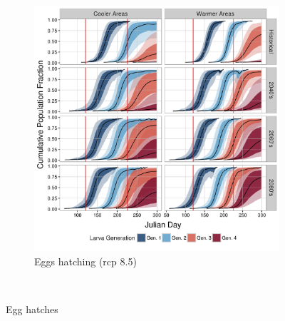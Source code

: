 \documentclass[12pt]{article}
\theoremstyle{plain}
\theoremstyle{definition}
\theoremstyle{definition}
\begin{document}
\begin{figure}[h!]
\begin{subfigure}[b]{0.48\textwidth}
        \includegraphics[width=\textwidth]{figures/plot_eggHatch_rcp85}
        \caption{Eggs hatching (rcp 8.5)}
        \label{fig:Eggs_Hatch_85}
    \end{subfigure}\\
   \caption{Egg hatches}\label{fig:Egg_hatchs}
\end{figure}
\end{document}
